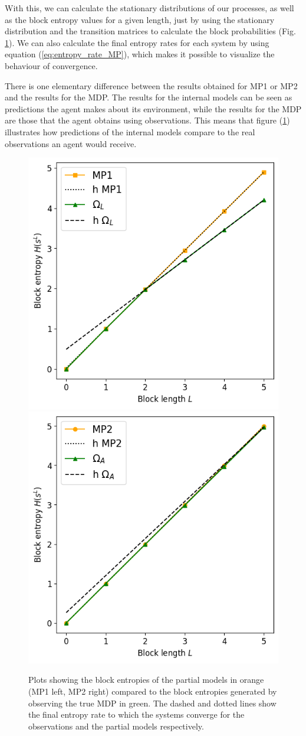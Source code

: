 \documentclass[12pt,a4paper]{article}
\begin{document}
With this, we can calculate the stationary distributions of our processes, as well as the block entropy values for a given length, just by using the stationary distribution and the transition matrices to calculate the block probabilities (Fig. \ref{fig:block_curves}).
We can also calculate the final entropy rates for each system by using equation (\ref{eq:entropy_rate_MP}), which makes it possible to visualize the behaviour of convergence.

There is one elementary difference between the results obtained for MP1 or MP2 and the results for the MDP.
The results for the internal models can be seen as predictions the agent makes about its environment, while the results for the MDP are those that the agent obtains using observations.
This means that figure (\ref{fig:block_curves}) illustrates how predictions of the internal models compare to the real observations an agent would receive.

\begin{figure}[H]
    \centering
    \includegraphics[width=0.49\linewidth]{../figures/mp1_obs_L_thesis.png}
    \includegraphics[width=0.49\linewidth]{../figures/mp2_obs_A_thesis.png}
    \caption{\label{fig:block_curves}Plots showing the block entropies of the partial models in orange (MP1 left, MP2 right) compared to the block entropies generated by observing the true MDP in green. The dashed and dotted lines show the final entropy rate to which the systems converge for the observations and the partial models respectively.}
\end{figure}
\end{document}
